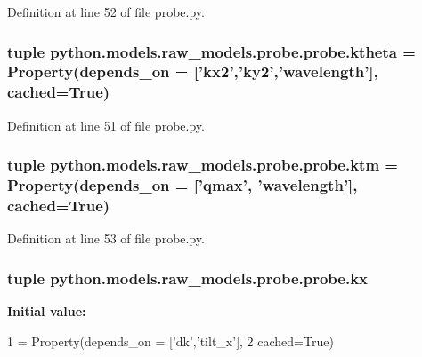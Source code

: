 Definition at line 52 of file probe.\-py.

\hypertarget{classpython_1_1models_1_1raw__models_1_1probe_1_1probe_abc3dec0808da79189354802918167c06}{
\subsubsection[{ktheta}]{\setlength{\rightskip}{0pt plus 5cm}tuple python.\-models.\-raw\-\_\-models.\-probe.\-probe.\-ktheta = Property(depends\-\_\-on = \mbox{[}'{\bf kx2}','{\bf ky2}','{\bf wavelength}'\mbox{]}, cached=True)\hspace{0.3cm}{\ttfamily [static]}}}\label{classpython_1_1models_1_1raw__models_1_1probe_1_1probe_abc3dec0808da79189354802918167c06}


Definition at line 51 of file probe.\-py.

\hypertarget{classpython_1_1models_1_1raw__models_1_1probe_1_1probe_a7dd5ccd3e89cd0a6e94ba8b04bd11c06}{
\subsubsection[{ktm}]{\setlength{\rightskip}{0pt plus 5cm}tuple python.\-models.\-raw\-\_\-models.\-probe.\-probe.\-ktm = Property(depends\-\_\-on = \mbox{[}'{\bf qmax}', '{\bf wavelength}'\mbox{]}, cached=True)\hspace{0.3cm}{\ttfamily [static]}}}\label{classpython_1_1models_1_1raw__models_1_1probe_1_1probe_a7dd5ccd3e89cd0a6e94ba8b04bd11c06}


Definition at line 53 of file probe.\-py.

\hypertarget{classpython_1_1models_1_1raw__models_1_1probe_1_1probe_a2df0b681e6bf2f7ac215f9d0174de2ea}{
\subsubsection[{kx}]{\setlength{\rightskip}{0pt plus 5cm}tuple python.\-models.\-raw\-\_\-models.\-probe.\-probe.\-kx\hspace{0.3cm}{\ttfamily [static]}}}\label{classpython_1_1models_1_1raw__models_1_1probe_1_1probe_a2df0b681e6bf2f7ac215f9d0174de2ea}
{\bfseries Initial value\-:}
\begin{DoxyCode}
1 = Property(depends\_on = [\textcolor{stringliteral}{'dk'},\textcolor{stringliteral}{'tilt\_x'}], 
2                   cached=\textcolor{keyword}{True})
\end{DoxyCode}


